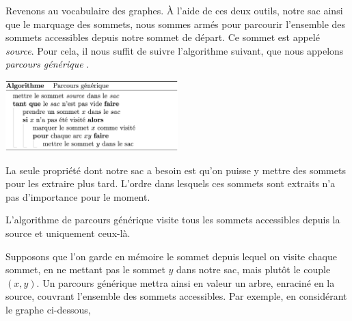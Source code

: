 \documentclass{magnolia}
\begin{document}
Revenons au vocabulaire des graphes. À l'aide de ces deux outils, notre sac ainsi que le
marquage des sommets, nous sommes armés pour parcourir l'ensemble des sommets accessibles
depuis notre sommet de départ. Ce sommet est appelé \emph{source}. Pour cela, il
nous suffit de suivre
l'algorithme suivant, que nous appelons \og \emph{parcours générique} \fg.
\begin{center}
  \includegraphics[width=0.5\textwidth]{../../Commun/Images/python-cours-parcours_generique}
\end{center}
\vspace{2ex}
\noindent
La seule propriété dont notre sac a besoin est qu'on puisse y mettre des
sommets pour les extraire plus tard. L'ordre dans lesquels ces sommets sont extraits
n'a pas d'importance pour le moment.

\begin{proposition}
L'algorithme de parcours générique visite tous les sommets accessibles depuis la source
et uniquement ceux-là.
\end{proposition}

Supposons que l'on garde en mémoire le sommet depuis lequel on visite chaque sommet,
en ne mettant pas le sommet $y$ dans notre sac, mais plutôt le couple $(x, y)$.
Un parcours
générique mettra ainsi en valeur un arbre, enraciné en la source, couvrant l'ensemble des
sommets accessibles. Par exemple, en considérant
le graphe ci-dessous,
\end{document}
